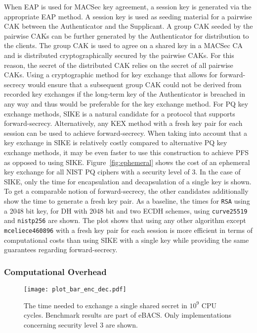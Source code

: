 When \ac{EAP} is used for MACSec key agreement, a session key is generated via the appropriate \ac{EAP} method. A session key is used as seeding material for a pairwise \ac{CAK} between the Authenticator and the Supplicant. A group \ac{CAK} seeded by the pairwise \acp{CAK} can be further generated by the Authenticator for distribution to the clients. The group \ac{CAK} is used to agree on a shared key in a MACSec \ac{CA} and is distributed cryptographically secured by the pairwise \acp{CAK}. For this reason, the secret of the distributed \ac{CAK} relies on the secret of all pairwise \acp{CAK}. Using a cryptographic method for key exchange that allows for forward-secrecy would ensure that a subsequent group \ac{CAK} could not be derived from recorded key exchanges if the long-term key of the Authenticator is breached in any way and thus would be preferable for the key exchange method. For \ac{PQ} key exchange methods, SIKE is a natural candidate for a protocol that supports forward-secrecy. Alternatively, any \ac{KEX} method with a fresh key pair for each session can be used to achieve forward-secrecy. When taking into account that a key exchange in SIKE is relatively costly compared to alternative \ac{PQ} key exchange methods, it may be even faster to use this construction to achieve \ac{PFS} as opposed to using SIKE. Figure~\ref{fig:ephemeral} shows the cost of an ephemeral key exchange for all \ac{NIST} \ac{PQ} ciphers with a security level of 3. In the case of SIKE, only the time for encapsulation and decapsulation of a single key is shown. To get a comparable notion of forward-secrecy, the other candidates additionally show the time to generate a fresh key pair. As a baseline, the times for \texttt{RSA} using a 2048 bit key, for \ac{DH} with 2048 bit and two \ac{ECDH} schemes, using \texttt{curve25519} and \texttt{nistp256} are shown. The plot shows that using any other algorithm except \texttt{mceliece460896} with a fresh key pair for each session is more efficient in terms of computational costs than using SIKE with a single key while providing the same guarantees regarding forward-secrecy.

\subsubsection{Computational Overhead}

\begin{figure}[ht]
    \centering\texttt{[image: plot\_bar\_enc\_dec.pdf]}
    \caption{The time needed to exchange a single shared secret in \(10^9\) \ac{CPU} cycles. Benchmark results are part of eBACS\cite{eBACS}. Only implementations concerning security level 3 are shown.}\label{fig:pq_computing}
\end{figure}

